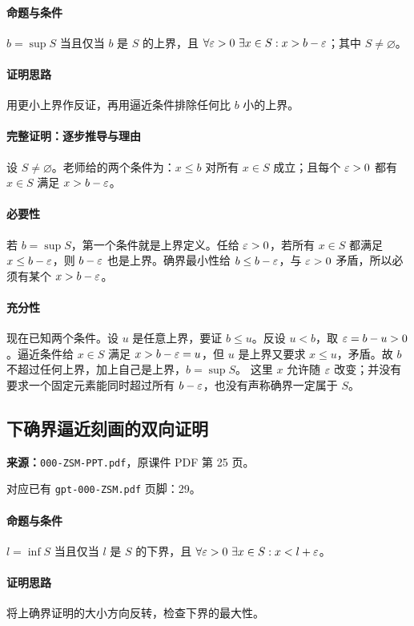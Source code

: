 \paragraph{命题与条件}$b=\sup S$ 当且仅当 $b$ 是 $S$ 的上界，且 $\forall\varepsilon>0\ \exists x\in S:x>b-\varepsilon$；其中 $S\ne\varnothing$。
\paragraph{证明思路}用更小上界作反证，再用逼近条件排除任何比 $b$ 小的上界。
\paragraph{完整证明：逐步推导与理由}

设 $S\ne\varnothing$。老师给的两个条件为：$x\le b$ 对所有 $x\in S$ 成立；且每个 $\varepsilon>0$ 都有 $x\in S$ 满足 $x>b-\varepsilon$。
\paragraph{必要性}若 $b=\sup S$，第一个条件就是上界定义。任给 $\varepsilon>0$，若所有 $x\in S$ 都满足 $x\le b-\varepsilon$，则 $b-\varepsilon$ 也是上界。确界最小性给 $b\le b-\varepsilon$，与 $\varepsilon>0$ 矛盾，所以必须有某个 $x>b-\varepsilon$。
\paragraph{充分性}现在已知两个条件。设 $u$ 是任意上界，要证 $b\le u$。反设 $u<b$，取 $\varepsilon=b-u>0$。逼近条件给 $x\in S$ 满足 $x>b-\varepsilon=u$，但 $u$ 是上界又要求 $x\le u$，矛盾。故 $b$ 不超过任何上界，加上自己是上界，$b=\sup S$。
这里 $x$ 允许随 $\varepsilon$ 改变；并没有要求一个固定元素能同时超过所有 $b-\varepsilon$，也没有声称确界一定属于 $S$。

\clearpage\subsection{下确界逼近刻画的双向证明}
\textbf{来源：}\texttt{000-ZSM-PPT.pdf}，原课件 PDF 第 25 页。\par
对应已有 \texttt{gpt-000-ZSM.pdf} 页脚：29。\par
\paragraph{命题与条件}$l=\inf S$ 当且仅当 $l$ 是 $S$ 的下界，且 $\forall\varepsilon>0\ \exists x\in S:x<l+\varepsilon$。
\paragraph{证明思路}将上确界证明的大小方向反转，检查下界的最大性。

